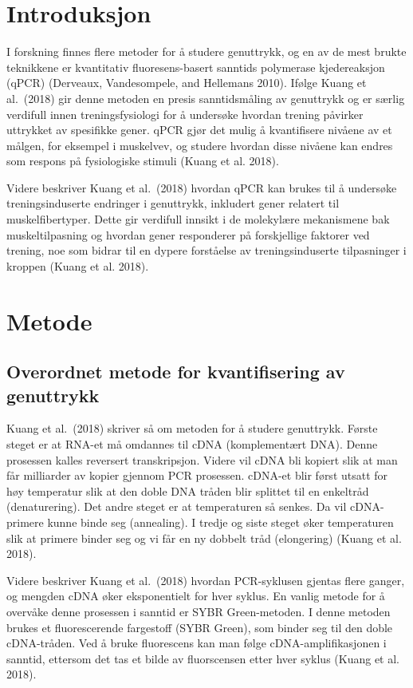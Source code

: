 \documentclass[
  letterpaper,
  DIV=11,
  numbers=noendperiod]{scrreprt}
\begin{document}
\section{Introduksjon}\label{introduksjon-5}

I forskning finnes flere metoder for å studere genuttrykk, og en av de
mest brukte teknikkene er kvantitativ fluoresens-basert sanntids
polymerase kjedereaksjon (qPCR) (Derveaux, Vandesompele, and Hellemans
2010). Ifølge Kuang et al.~(2018) gir denne metoden en presis
sanntidsmåling av genuttrykk og er særlig verdifull innen
treningsfysiologi for å undersøke hvordan trening påvirker uttrykket av
spesifikke gener. qPCR gjør det mulig å kvantifisere nivåene av et
målgen, for eksempel i muskelvev, og studere hvordan disse nivåene kan
endres som respons på fysiologiske stimuli (Kuang et al. 2018).

Videre beskriver Kuang et al.~(2018) hvordan qPCR kan brukes til å
undersøke treningsinduserte endringer i genuttrykk, inkludert gener
relatert til muskelfibertyper. Dette gir verdifull innsikt i de
molekylære mekanismene bak muskeltilpasning og hvordan gener responderer
på forskjellige faktorer ved trening, noe som bidrar til en dypere
forståelse av treningsinduserte tilpasninger i kroppen (Kuang et al.
2018).

\section{Metode}\label{metode-5}

\subsection{Overordnet metode for kvantifisering av
genuttrykk}\label{overordnet-metode-for-kvantifisering-av-genuttrykk}

Kuang et al.~(2018) skriver så om metoden for å studere genuttrykk.
Første steget er at RNA-et må omdannes til cDNA (komplementært DNA).
Denne prosessen kalles reversert transkripsjon. Videre vil cDNA bli
kopiert slik at man får milliarder av kopier gjennom PCR prosessen.
cDNA-et blir først utsatt for høy temperatur slik at den doble DNA
tråden blir splittet til en enkeltråd (denaturering). Det andre steget
er at temperaturen så senkes. Da vil cDNA-primere kunne binde seg
(annealing). I tredje og siste steget øker temperaturen slik at primere
binder seg og vi får en ny dobbelt tråd (elongering) (Kuang et al.
2018).

Videre beskriver Kuang et al.~(2018) hvordan PCR-syklusen gjentas flere
ganger, og mengden cDNA øker eksponentielt for hver syklus. En vanlig
metode for å overvåke denne prosessen i sanntid er SYBR Green-metoden. I
denne metoden brukes et fluorescerende fargestoff (SYBR Green), som
binder seg til den doble cDNA-tråden. Ved å bruke fluorescens kan man
følge cDNA-amplifikasjonen i sanntid, ettersom det tas et bilde av
fluorscensen etter hver syklus (Kuang et al. 2018).
\end{document}
